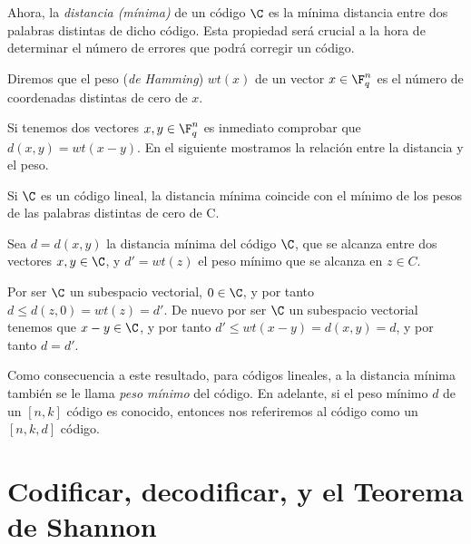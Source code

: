 Ahora, la \textit{distancia (mínima)} de un código \(\C\) es la mínima distancia entre dos palabras distintas de dicho código. Esta propiedad será crucial a la hora de determinar el número de errores que podrá corregir un código.

\begin{definition}
Diremos que el peso (\textit{de Hamming}) \(wt(x)\) de un vector \(x \in \F_q^n\) es el número de coordenadas distintas de cero de \(x\).
\end{definition}

Si tenemos dos vectores \(x, y \in \F_q^n\) es inmediato comprobar que \(d(x,y) = wt(x - y)\). En el siguiente mostramos la relación entre la distancia y el peso.

\begin{proposition}
Si \(\C\) es un  código lineal, la distancia mínima coincide con el mínimo de los pesos de las palabras distintas de cero de C.

\begin{proofs}
Sea \(d = d(x,y)\) la distancia mínima del código \(\C\), que se alcanza entre dos vectores \(x, y \in \C\), y \(d' = wt(z)\) el peso mínimo que se alcanza en \(z \in C\).

Por ser \(\C\) un subespacio vectorial,  \(0 \in \C\), y por tanto  \(d \leq d(z, 0) = wt(z) = d'\). De nuevo por ser \(\C\) un subespacio vectorial tenemos que \(x-y \in \C\), y por tanto  \(d' \leq wt(x-y) = d(x,y) = d\), y por tanto \(d = d'\).
\end{proofs}
\end{proposition}

Como consecuencia a este resultado, para códigos lineales, a la distancia mínima también se le llama \textit{peso mínimo} del código. En adelante, si el peso mínimo \(d\) de un \([n,k]\) código es conocido, entonces nos referiremos al código como un \([n,k,d]\) código.

\section{Codificar, decodificar, y el Teorema de Shannon}

